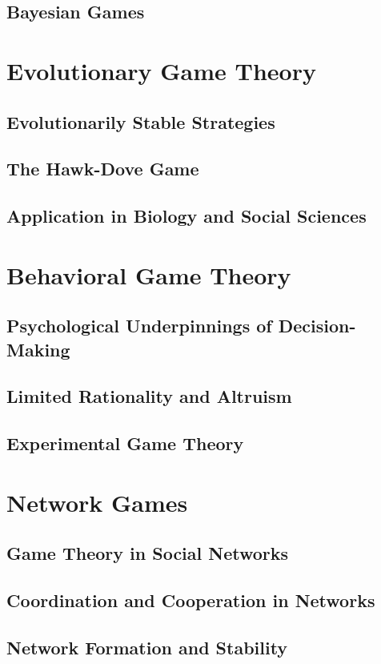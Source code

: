 \documentclass[12pt]{book} %
\begin{document}
\subsection{Bayesian Games}

\section{Evolutionary Game Theory}
\subsection{Evolutionarily Stable Strategies}
\subsection{The Hawk-Dove Game}
\subsection{Application in Biology and Social Sciences}

\section{Behavioral Game Theory}
\subsection{Psychological Underpinnings of Decision-Making}
\subsection{Limited Rationality and Altruism}
\subsection{Experimental Game Theory}

\section{Network Games}
\subsection{Game Theory in Social Networks}
\subsection{Coordination and Cooperation in Networks}
\subsection{Network Formation and Stability}
\end{document}
